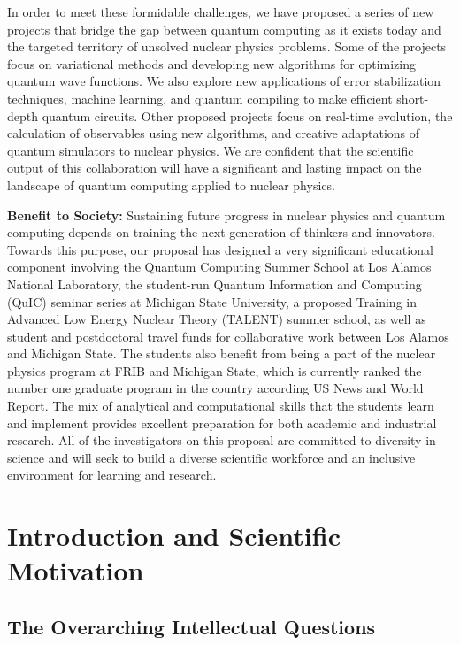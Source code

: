 \documentclass[10pt]{article}
\begin{document}
In order to meet these formidable challenges, we have proposed a series of new projects that bridge the gap between quantum computing as it exists today and the targeted territory of unsolved nuclear physics problems.  Some of the projects focus on variational methods and developing new algorithms for optimizing quantum wave functions.  We also explore new applications of error stabilization techniques, machine learning, and quantum compiling to make efficient short-depth quantum circuits. Other proposed projects focus on real-time evolution, the calculation of observables using new algorithms, and creative adaptations of quantum simulators to nuclear physics.  We are confident that the scientific output of this collaboration will have a significant and lasting impact on the landscape of quantum computing applied to nuclear physics.

{\bf Benefit to Society:}  Sustaining future progress in nuclear physics and quantum computing depends on training the next generation of thinkers and innovators.  Towards this purpose, our proposal has designed a very significant educational component involving the Quantum Computing Summer School at Los Alamos National Laboratory, the student-run Quantum Information and Computing (QuIC) seminar series at Michigan State University, a proposed Training in Advanced Low Energy Nuclear Theory (TALENT) summer school, as well as student and postdoctoral travel funds for collaborative work between Los Alamos and Michigan State.  The students also benefit from being a part of the nuclear physics program at FRIB and Michigan State, which is currently ranked the number one graduate program in the country according US News and World Report. The mix of analytical and computational skills that the students learn and implement provides excellent preparation for both academic and industrial research. All of the investigators on this proposal are committed to diversity in science and will seek to build a diverse scientific workforce and an inclusive environment for learning and research.

\section{Introduction and Scientific Motivation}

\subsection{The Overarching Intellectual Questions}
\end{document}

